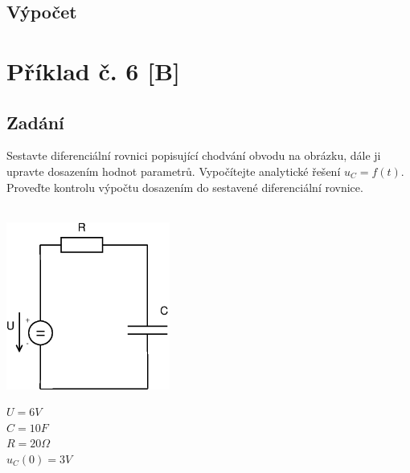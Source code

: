 \documentclass[12pt,a4paper,titlepage,final]{article}
\begin{document}

	\subsection*{Výpočet}
	
	\begin{tabbing}
		
	\end{tabbing}
	
	\newpage
	

	\section*{Příklad č. 6 [B]} \label{pr6}


	\subsection*{Zadání}

	Sestavte diferenciální rovnici popisující chodvání obvodu na obrázku, dále 
	ji \\ upravte dosazením hodnot parametrů. Vypočítejte analytické řešení
	$u_{C} = f(t)$. \\ Proveďte kontrolu výpočtu dosazením do sestavené
	diferenciální rovnice. \\
	\\
	
	\begin{minipage}[c]{0.4\textwidth}
		\includegraphics[height=5.5cm]{img/Pr6_2012.eps}
		\label{fig:pr6_obvod}
	\end{minipage}
	\begin{minipage}[c]{0.25\textwidth}
		$U = 6 V$ \\
		$C = 10 F$ \\
		$R = 20 \Omega $ \\
		$u_{C}(0) = 3 V$ \\
	\end{minipage}
	\\
\end{document}
